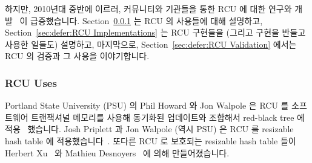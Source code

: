 하지만, 2010년대 중반에 이르러, 커뮤니티와 기관들을 통한 RCU 에 대한 연구와
개발~\cite{FransKaashoek2015ParallelOSHistory} 이 급증했습니다.
Section~\ref{sec:defer:RCU Uses} 는 RCU 의 사용들에 대해 설명하고,
Section~\ref{sec:defer:RCU Implementations} 는 RCU 구현들을 (그리고 구현을
반들고 사용한 일들도) 설명하고, 마지막으로,
Section~\ref{sec:defer:RCU Validation} 에서는 RCU 의 검증과 그 사용을
이야기합니다.
\iffalse

However, in the mid 2010s, there was a welcome upsurge in RCU research
and development across a number of communities and
institutions~\cite{FransKaashoek2015ParallelOSHistory}.
Section~\ref{sec:defer:RCU Uses} describes uses of RCU,
Section~\ref{sec:defer:RCU Implementations} describes RCU implementations
(as well as work that both creates and uses an implementation),
and finally,
Section~\ref{sec:defer:RCU Validation} describes verification and validation
of RCU and its uses.
\fi

\subsubsection{RCU Uses}
\label{sec:defer:RCU Uses}

Portland State University (PSU) 의 Phil Howard 와 Jon Walpole 은 RCU 를
소프트웨어 트랜잭셔널 메모리를 사용해 동기화된 업데이트와 조합해서 red-black
tree 에 적용~\cite{PhilHowardPhD,PhilHoward2011RCUTMRBTree} 했습니다.
Josh Priplett 과 Jon Walpole (역시 PSU) 은 RCU 를 resizable hash table 에
적용했습니다~\cite{JoshTriplettPhD,Triplett:2011:RPHash,JonCorbet2014RCUhash1,JonCorbet2014RCUhash2}.
또다른 RCU 로 보호되는 resizable hash table 들이 Herbert
Xu~\cite{HerbertXu2010RCUResizeHash} 와 Mathieu
Desnoyers~\cite{PaulMcKenney2013LWNURCUhash} 에 의해 만들어졌습니다.
\iffalse

Phil Howard and Jon Walpole of Portland State University (PSU) have
applied RCU to red-black
trees~\cite{PhilHowardPhD,PhilHoward2011RCUTMRBTree} combined with updates
synchronized using software transactional memory.
Josh Triplett and Jon Walpole (again of PSU) applied RCU to resizable
hash tables~\cite{JoshTriplettPhD,Triplett:2011:RPHash,JonCorbet2014RCUhash1,JonCorbet2014RCUhash2}.
Other RCU-protected resizable hash tables have been created by
Herbert Xu~\cite{HerbertXu2010RCUResizeHash} and by
Mathieu Desnoyers~\cite{PaulMcKenney2013LWNURCUhash}.
\fi

